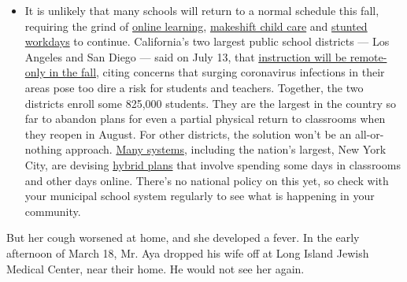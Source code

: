 \begin{itemize}
  \begin{itemize}
  \tightlist
  \item
    It is unlikely that many schools will return to a normal schedule
    this fall, requiring the grind of
    \href{https://www.nytimes3xbfgragh.onion/2020/06/05/us/coronavirus-education-lost-learning.html?action=click\&pgtype=Article\&state=default\&region=MAIN_CONTENT_3\&context=storylines_faq}{online
    learning},
    \href{https://www.nytimes3xbfgragh.onion/2020/05/29/us/coronavirus-child-care-centers.html?action=click\&pgtype=Article\&state=default\&region=MAIN_CONTENT_3\&context=storylines_faq}{makeshift
    child care} and
    \href{https://www.nytimes3xbfgragh.onion/2020/06/03/business/economy/coronavirus-working-women.html?action=click\&pgtype=Article\&state=default\&region=MAIN_CONTENT_3\&context=storylines_faq}{stunted
    workdays} to continue. California's two largest public school
    districts --- Los Angeles and San Diego --- said on July 13, that
    \href{https://www.nytimes3xbfgragh.onion/2020/07/13/us/lausd-san-diego-school-reopening.html?action=click\&pgtype=Article\&state=default\&region=MAIN_CONTENT_3\&context=storylines_faq}{instruction
    will be remote-only in the fall}, citing concerns that surging
    coronavirus infections in their areas pose too dire a risk for
    students and teachers. Together, the two districts enroll some
    825,000 students. They are the largest in the country so far to
    abandon plans for even a partial physical return to classrooms when
    they reopen in August. For other districts, the solution won't be an
    all-or-nothing approach.
    \href{https://bioethics.jhu.edu/research-and-outreach/projects/eschool-initiative/school-policy-tracker/}{Many
    systems}, including the nation's largest, New York City, are
    devising
    \href{https://www.nytimes3xbfgragh.onion/2020/06/26/us/coronavirus-schools-reopen-fall.html?action=click\&pgtype=Article\&state=default\&region=MAIN_CONTENT_3\&context=storylines_faq}{hybrid
    plans} that involve spending some days in classrooms and other days
    online. There's no national policy on this yet, so check with your
    municipal school system regularly to see what is happening in your
    community.
  \end{itemize}
\end{itemize}

But her cough worsened at home, and she developed a fever. In the early
afternoon of March 18, Mr. Aya dropped his wife off at Long Island
Jewish Medical Center, near their home. He would not see her again.

